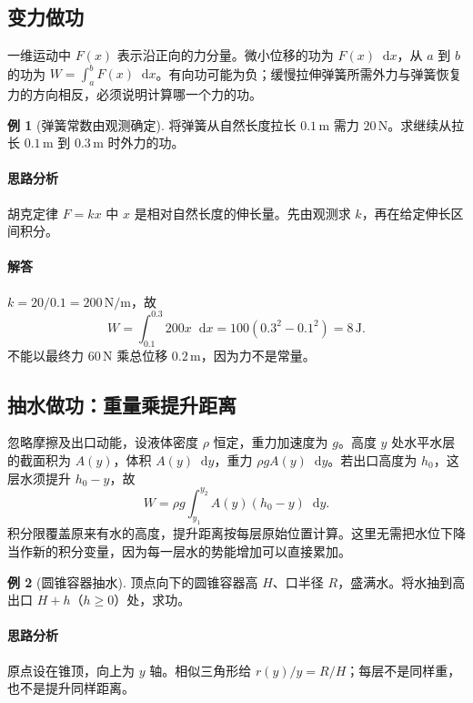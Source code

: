 \documentclass[UTF8,fontset=fandol,12pt,oneside,openany]{ctexrep}
\newcommand{\dd}{\mathop{}\!\mathrm d}
\theoremstyle{definition}
\newtheorem{example}{例}[chapter]
\begin{document}
\subsection{变力做功}
一维运动中 $F(x)$ 表示沿正向的力分量。微小位移的功为 $F(x)\dd x$，从 $a$ 到 $b$ 的功为 $W=\int_a^bF(x)\dd x$。有向功可能为负；缓慢拉伸弹簧所需外力与弹簧恢复力的方向相反，必须说明计算哪一个力的功。

\begin{example}[弹簧常数由观测确定]
将弹簧从自然长度拉长 $0.1\,\mathrm m$ 需力 $20\,\mathrm N$。求继续从拉长 $0.1\,\mathrm m$ 到 $0.3\,\mathrm m$ 时外力的功。
\end{example}
\paragraph{思路分析}胡克定律 $F=kx$ 中 $x$ 是相对自然长度的伸长量。先由观测求 $k$，再在给定伸长区间积分。
\paragraph{解答}$k=20/0.1=200\,\mathrm{N/m}$，故
\[
 W=\int_{0.1}^{0.3}200x\dd x=100(0.3^2-0.1^2)=8\,\mathrm J.
\]
不能以最终力 $60\,\mathrm N$ 乘总位移 $0.2\,\mathrm m$，因为力不是常量。

\subsection{抽水做功：重量乘提升距离}
忽略摩擦及出口动能，设液体密度 $\rho$ 恒定，重力加速度为 $g$。高度 $y$ 处水平水层的截面积为 $A(y)$，体积 $A(y)\dd y$，重力 $\rho gA(y)\dd y$。若出口高度为 $h_0$，这层水须提升 $h_0-y$，故
\[
 W=\rho g\int_{y_1}^{y_2}A(y)(h_0-y)\dd y.
\]
积分限覆盖原来有水的高度，提升距离按每层原始位置计算。这里无需把水位下降当作新的积分变量，因为每一层水的势能增加可以直接累加。

\begin{example}[圆锥容器抽水]
顶点向下的圆锥容器高 $H$、口半径 $R$，盛满水。将水抽到高出口 $H+h$（$h\ge0$）处，求功。
\end{example}
\paragraph{思路分析}原点设在锥顶，向上为 $y$ 轴。相似三角形给 $r(y)/y=R/H$；每层不是同样重，也不是提升同样距离。
\end{document}
